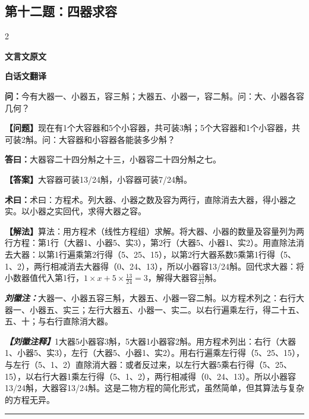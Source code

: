 \documentclass[10pt,a4paper]{article}
\newcommand{\wen}[1]{\textbf{\color{problemcolor}问：}#1\par}
\newcommand{\da}[1]{\textbf{答曰：}#1\par}
\newcommand{\shu}[1]{\textbf{术曰：}#1\par}
\newcommand{\liuhui}[1]{{\color{commentarycolor}\textit{\textbf{刘徽注：}}#1\par}}
\newcommand{\classicalheader}[1]{{\centering\large\bfseries\color{classicalcolor} #1\par\vspace{0.5em}}}
\newcommand{\wenmodern}[1]{\textbf{\color{moderncolor}【问题】}#1\par}
\newcommand{\damodern}[1]{\textbf{【答案】}#1\par}
\newcommand{\shumodern}[1]{\textbf{【解法】}#1\par}
\newcommand{\liuhuimodern}[1]{{\color{commentarycolor}\textit{\textbf{【刘徽注释】}}#1\par}}
\newcommand{\modernheader}[1]{{\centering\large\bfseries\color{moderncolor} #1\par\vspace{0.5em}}}
\newcommand{\problemsec}[1]{\subsection*{#1}}
\begin{document}
\problemsec{第十二题：四器求容}
\begin{paracol}{2}
\classicalheader{文言文原文}
\switchcolumn
\modernheader{白话文翻译}
\switchcolumn*

\wen{今有大器一、小器五，容三斛；大器五、小器一，容二斛。问：大、小器各容几何？}

\switchcolumn

\wenmodern{现在有1个大容器和5个小容器，共可装3斛；5个大容器和1个小容器，共可装2斛。问：大容器和小容器各能装多少斛？}

\switchcolumn*

\da{大器容二十四分斛之十三，小器容二十四分斛之七。}

\switchcolumn

\damodern{大容器可装13/24斛，小容器可装7/24斛。}

\switchcolumn*

\shu{术曰：方程术。列大器、小器之数及容为两行，直除消去大器，得小器之实。以小器之实回代，求得大器之容。}

\switchcolumn

\shumodern{算法：用方程术（线性方程组）求解。将大器、小器的数量及容量列为两行方程：第1行（大器1、小器5、实3），第2行（大器5、小器1、实2）。用直除法消去大器：以第1行遍乘第2行得（5、25、15），以第2行大器系数5乘第1行得（5、1、2），两行相减消去大器得（0、24、13），所以小器容13/24斛。回代求大器：将小数器值代入第1行，$1×x+5×\frac{13}{24}=3$，解得大器容$\frac{13}{24}$斛。}

\switchcolumn*

\liuhui{大器一、小器五容三斛，大器五、小器一容二斛。以方程术列之：右行大器一、小器五、实三；左行大器五、小器一、实二。以右行遍乘左行，得二十五、五、十；与右行直除消大器。}

\switchcolumn

\liuhuimodern{1大器5小器容3斛，5大器1小器容2斛。用方程术列出：右行（大器1、小器5、实3），左行（大器5、小器1、实2）。用右行遍乘左行得（5、25、15），与左行（5、1、2）直除消大器：或者反过来，以左行大器5乘右行得（5、25、15），以右行大器1乘左行得（5、1、2），两行相减得（0、24、13）。所以小器容13/24斛，大器容13/24斛。这是二物方程的简化形式，虽然简单，但其算法与复杂的方程无异。}

\end{paracol}

\vspace{0.3cm}
\hrule
\vspace{0.3cm}
\end{document}
